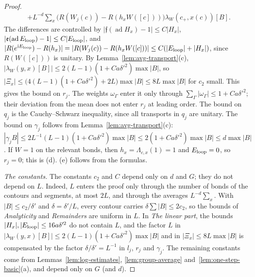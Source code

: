 \begin{proof}
\[\begin{aligned}
&+L^{-d}\sum_x\big(R(W_j(c))-R(h_xW([c]))\big)\lambda_W(c_+,x(c))[B].
\end{aligned}
\]
The differences are controlled by $|\mathfrak f(\operatorname{ad}H_x)-1|\le C|H_x|$, $|\mathfrak e(\operatorname{ad}E_{\rm loop})-1|\le C|E_{\rm loop}|$, and $|R(e^{\mathrm i E_{\rm loop}})-R(h_x)|=|R(W_j(c))-R(h_xW([c]))|\le C(|E_{\rm loop}|+|H_x|)$, since $R(W([c]))$ is unitary. By Lemma~\ref{lem:avg-transport}(c), $|\lambda_W(y,x)[B]|\le2(L-1)(1+Ca\delta'^2)\max|B|$, so $|\Xi_x|\le\big(4(L-1)(1+Ca\delta'^2)+2L\big)\max|B|\le8L\max|B|$ for $c_2$ small. This gives the bound on $r_j$. The weights $\omega_\Gamma$ enter it only through $\sum_\Gamma|\omega_\Gamma|\le1+Ca\delta'^2$; their deviation from the mean does not enter $r_j$ at leading order. The bound on $q_j$ is the Cauchy--Schwarz inequality, since all transports in $q_j$ are unitary. The bound on $\gamma_j$ follows from Lemma~\ref{lem:avg-transport}(c): $|\gamma_jB|\le2L^{-1}(L-1)(1+Ca\delta'^2)\max|B|\le2(1+Ca\delta'^2)\max|B|\le d\max|B|$. If $W=1$ on the relevant bonds, then $h_x=\Lambda_{c,x}(1)=1$ and $E_{\rm loop}=0$, so $r_j=0$; this is (d). (e) follows from the formulas.

\emph{The constants.} The constants $c_2$ and $C$ depend only on $d$ and $G$; they do not depend on $L$. Indeed, $L$ enters the proof only through the number of bonds of the contours and segments, at most $2L$, and through the averages $L^{-d}\sum_x$. With $|B|\le c_2/\delta'$ and $\delta=\delta'/L$, every contour carries $\delta\sum|B|\le2c_2$, so the bounds of \emph{Analyticity} and \emph{Remainders} are uniform in $L$. In \emph{The linear part}, the bounds $|H_x|,|E_{\rm loop}|\le16a\delta'^2$ do not contain $L$, and the factor $L$ in $|\lambda_W(y,x)[B]|\le2(L-1)(1+Ca\delta'^2)\max|B|$ and in $|\Xi_x|\le8L\max|B|$ is compensated by the factor $\delta/\delta'=L^{-1}$ in $l_j$, $r_j$ and $\gamma_j$. The remaining constants come from Lemmas~\ref{lem:log-estimates}, \ref{lem:group-average} and~\ref{lem:one-step-basic}(a), and depend only on $G$ (and $d$).


\end{proof}
